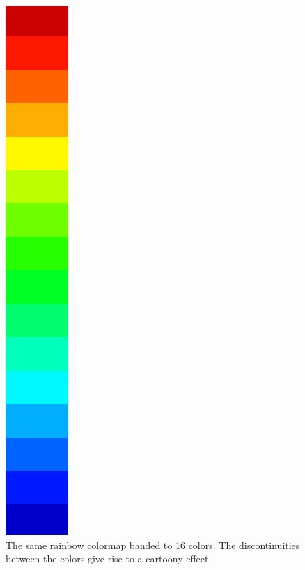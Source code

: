 		\begin{figure}[htb]
			\centering
			\includegraphics[angle=270, width=\linewidth, totalheight=1em, frame]{./content/pictures/rainbow_16.png}
			\caption{The same rainbow colormap banded to 16 colors. The discontinuities between the colors give rise to a cartoony effect.}
			\label{fig:rainbow_banded}
		\end{figure}
